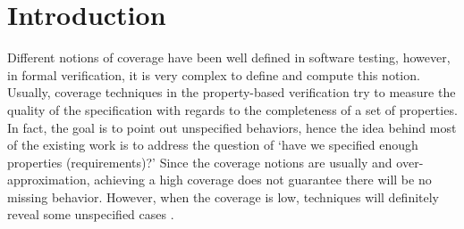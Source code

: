 \section{Introduction}
\label{sec:intro}

Different notions of coverage have been well defined in software testing, however, in formal verification, it is very complex to define and compute this notion. 
Usually, coverage techniques in the property-based verification try to measure the quality of the specification with regards to the completeness of a set of properties. 
In fact, the goal is to point out unspecified behaviors, hence the idea behind most of the existing work is to address the question of `have we specified enough properties (requirements)?' 
Since the coverage notions are usually  and over-approximation, achieving a high coverage does not guarantee there will be no missing behavior. However, when the coverage is low, techniques will definitely reveal some unspecified cases \cite{claessen2007coverage}. 